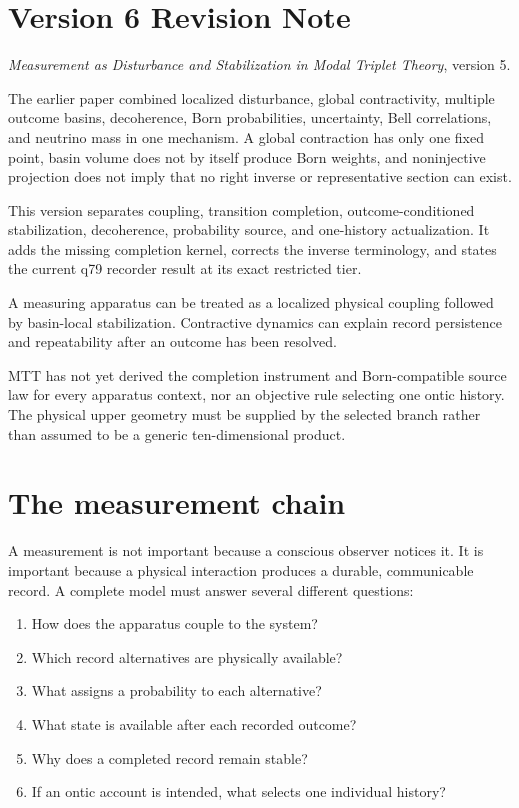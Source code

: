 \documentclass[11pt,a4paper]{article}
\theoremstyle{definition}
\theoremstyle{remark}
\begin{document}
\section*{Version 6 Revision Note}
\begin{description}[style=nextline]
\item[Supersedes] \emph{Measurement as Disturbance and Stabilization in Modal
Triplet Theory}, version 5.
\item[Reason] The earlier paper combined localized disturbance, global
contractivity, multiple outcome basins, decoherence, Born probabilities,
uncertainty, Bell correlations, and neutrino mass in one mechanism. A global
contraction has only one fixed point, basin volume does not by itself produce
Born weights, and noninjective projection does not imply that no right inverse
or representative section can exist.
\item[Resolution] This version separates coupling, transition completion,
outcome-conditioned stabilization, decoherence, probability source, and
one-history actualization. It adds the missing completion kernel, corrects the
inverse terminology, and states the current q79 recorder result at its exact
restricted tier.
\item[Retained result] A measuring apparatus can be treated as a localized
physical coupling followed by basin-local stabilization. Contractive dynamics
can explain record persistence and repeatability after an outcome has been
resolved.
\item[Remaining boundary] MTT has not yet derived the completion instrument
and Born-compatible source law for every apparatus context, nor an objective
rule selecting one ontic history. The physical upper geometry must be supplied
by the selected branch rather than assumed to be a generic ten-dimensional
product.
\end{description}

\tableofcontents

\section{The measurement chain}

A measurement is not important because a conscious observer notices it. It is
important because a physical interaction produces a durable, communicable
record. A complete model must answer several different questions:
\begin{enumerate}
\item How does the apparatus couple to the system?
\item Which record alternatives are physically available?
\item What assigns a probability to each alternative?
\item What state is available after each recorded outcome?
\item Why does a completed record remain stable?
\item If an ontic account is intended, what selects one individual history?
\end{enumerate}
\end{document}
